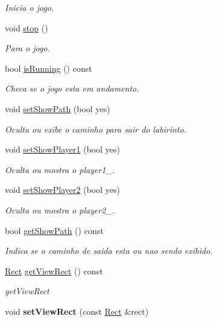 \begin{DoxyCompactItemize}
\begin{DoxyCompactList}\small\item\em Inicia o jogo. \end{DoxyCompactList}\item 
\hypertarget{class_game_a17fbb36fd4a2085f9ff4f1fa93d7d08b}{}void \hyperlink{class_game_a17fbb36fd4a2085f9ff4f1fa93d7d08b}{stop} ()\label{class_game_a17fbb36fd4a2085f9ff4f1fa93d7d08b}

\begin{DoxyCompactList}\small\item\em Para o jogo. \end{DoxyCompactList}\item 
bool \hyperlink{class_game_abb31098c8d016b98888fe9acac497fcb}{is\+Running} () const 
\begin{DoxyCompactList}\small\item\em Checa se o jogo esta em andamento. \end{DoxyCompactList}\item 
void \hyperlink{class_game_ad957f89ebf5557d687332737f5c48174}{set\+Show\+Path} (bool yes)
\begin{DoxyCompactList}\small\item\em Oculta ou exibe o caminho para sair do labirinto. \end{DoxyCompactList}\item 
void \hyperlink{class_game_acf0eab33d0720829856f04df97ae0b60}{set\+Show\+Player1} (bool yes)
\begin{DoxyCompactList}\small\item\em Oculta ou mostra o player1\+\_\+. \end{DoxyCompactList}\item 
void \hyperlink{class_game_a8c3fb62db4b6712d32dc02897464ef77}{set\+Show\+Player2} (bool yes)
\begin{DoxyCompactList}\small\item\em Oculta ou mostra o player2\+\_\+. \end{DoxyCompactList}\item 
bool \hyperlink{class_game_afc0740e2ebbf574081ba72894ffb167d}{get\+Show\+Path} () const 
\begin{DoxyCompactList}\small\item\em Indica se o caminho de saida esta ou nao sendo exibido. \end{DoxyCompactList}\item 
\hyperlink{class_rect}{Rect} \hyperlink{class_game_a5a0887d56454e9f31f800018f211ab1f}{get\+View\+Rect} () const 
\begin{DoxyCompactList}\small\item\em get\+View\+Rect \end{DoxyCompactList}\item 
\hypertarget{class_game_a4d1eb4468fe2a307fa7ca738dd7cfa40}{}void {\bfseries set\+View\+Rect} (const \hyperlink{class_rect}{Rect} \&rect)\label{class_game_a4d1eb4468fe2a307fa7ca738dd7cfa40}


\end{DoxyCompactItemize}
